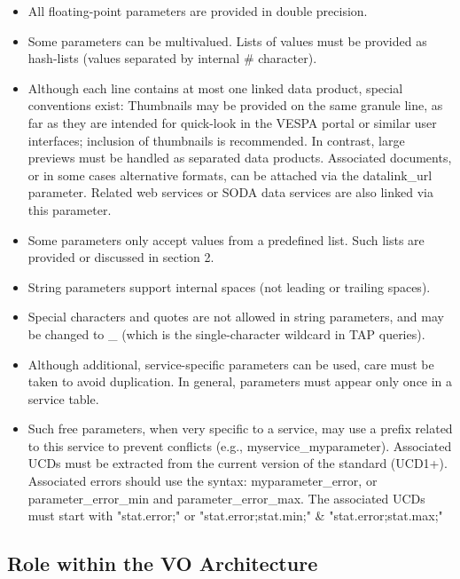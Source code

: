 \documentclass[11pt,a4paper]{ivoa}
\begin{document}
\begin{itemize}
\begin{itemize}
\item All floating-point parameters are provided in double precision.

\item Some parameters can be multivalued. Lists of values must be provided as hash-lists (values separated by internal \# character).

\item Although each line contains at most one linked data product, special conventions exist: 
Thumbnails may be provided on the same granule line, as far as they are intended for quick-look in the VESPA portal or similar user interfaces; inclusion of thumbnails is recommended. In contrast, large previews must be handled as separated data products.
Associated documents, or in some cases alternative formats, can be attached via the datalink\_url parameter. Related web services or SODA data services are also linked via this parameter.

\item Some parameters only accept values from a predefined list. Such lists are provided or discussed in section 2.

\item String parameters support internal spaces (not leading or trailing spaces).

\item Special characters and quotes are not allowed in string parameters, and may be changed to \_ (which is the single-character wildcard in TAP queries). 

\item Although additional, service-specific parameters can be used, care must be taken to avoid duplication. In general, parameters must appear only once in a service table.

\item Such free parameters, when very specific to a service, may use a prefix related to this service to prevent conflicts (e.g., myservice\_myparameter). Associated UCDs must be extracted from the current version of the standard (UCD1+).
Associated errors should use the syntax: myparameter\_error, or parameter\_error\_min and parameter\_error\_max. The associated UCDs must start with "stat.error;" or "stat.error;stat.min;" \& "stat.error;stat.max;"

\end{itemize}
\end{itemize}



\subsection{Role within the VO Architecture}
\end{document}

